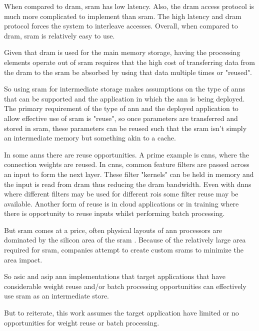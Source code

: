 When compared to \ac{dram}, \ac{sram} has low latency. Also, the \ac{dram} access protocol is much more complicated to implement than \ac{sram}. 
The high latency and \ac{dram} protocol forces the system to interleave accesses. Overall, when compared to \ac{dram}, \ac{sram} is relatively easy to use.

Given that \ac{dram} is used for the main memory storage, having the processing elements operate out of \ac{sram} requires that the high cost of transferring data from the \ac{dram} to the \ac{sram} be absorbed by using that data multiple times or "reused".

So using \ac{sram} for intermediate storage makes assumptions on the type of \acp{ann} that can be supported and the application in which the \ac{ann} is being deployed.
The primary requirement of the type of \ac{ann} and the deployed application to allow effective use of \ac{sram} is "reuse", so once parameters are transferred and stored in \ac{sram}, these parameters can be reused such that the \ac{sram} isn't simply an intermediate memory but something akin to a cache.

In some \ac{ann}s there are reuse opportunities. 
A prime example is \acp{cnn}, where the connection weights are reused. In \acp{cnn}, common feature filters are passed across an input to form the next layer. 
These filter "kernels" can be held in memory and the input is read from \ac{dram} thus reducing the \ac{dram} bandwidth.
Even with \ac{dnn}s where different filters may be used for different \acp{roi} some filter reuse may be available.
Another form of reuse is in cloud applications or in training where there is opportunity to reuse inputs whilst performing batch processing.

But \ac{sram} comes at a price, often physical layouts of \ac{ann} processors are dominated by the silicon area of the \ac{sram} \cite{kim2016neurocube}\cite{chen2014diannao}\cite{tensorflow2015-whitepaper}. 
Because of the relatively large area required for \ac{sram}, companies attempt to create custom \acp{sram} to minimize the area impact.

So \ac{asic} and \ac{asip} \ac{ann} implementations that target applications that have considerable weight reuse and/or batch processing opportunities can effectively use \ac{sram} as an intermediate store.

But to reiterate, this work assumes the target application have limited or no opportunities for weight reuse or batch processing.

\iffalse
So the question becomes, can a system employ \ac{dram} with minimal \ac{sram} and still meet the system requirements?
\fi

